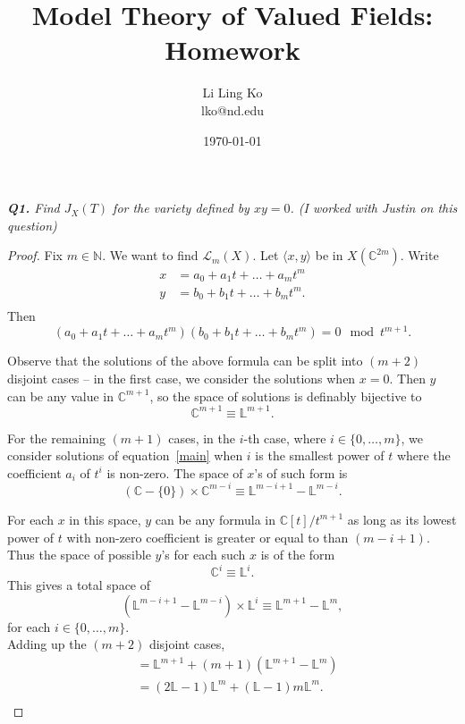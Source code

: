 \documentclass{article}
\begin{document}
\title{Model Theory of Valued Fields: Homework}
\author{Li Ling Ko\\ lko@nd.edu}
\date{\today}
\maketitle

\it \textbf{Q1.} Find $J_X(T)$ for the variety defined by $xy=0$. (I
worked with Justin on this question)
\begin{proof}
  Fix $m\in\mathbb{N}$. We want to find $\mathcal{L}_m(X)$. Let $\langle x,
  y\rangle$ be in $X(\mathbb{C}^{2m})$. Write
  \begin{align*}
    x &=a_0+a_1t+\ldots+a_mt^m\\
    y &=b_0+b_1t+\ldots+b_mt^m.\\
  \end{align*}
  Then
  \begin{equation}
    \label{main}
    (a_0+a_1t+\ldots+a_mt^m) (b_0+b_1t+\ldots+b_mt^m)=0 \mod t^{m+1}.
  \end{equation}

  Observe that the solutions of the above formula can be split into $(m+2)$
  disjoint cases -- in the first case, we consider the solutions when
  $x=0$. Then $y$ can be any value in $\mathbb{C}^{m+1}$, so the space of
  solutions is definably bijective to 
  \[\mathbb{C}^{m+1} \equiv \mathbb{L}^{m+1}.\]

  For the remaining $(m+1)$ cases, in the $i$-th case, where
  $i\in\{0,\ldots,m\}$, we consider solutions of equation~\eqref{main} when
  $i$ is the smallest power of $t$ where the coefficient $a_i$ of $t^i$ is
  non-zero. The space of $x$'s of such form is
  \[(\mathbb{C}-\{0\}) \times\mathbb{C}^{m-i} \equiv
  \mathbb{L}^{m-i+1}-\mathbb{L}^{m-i}.\]

  For each $x$ in this space, $y$ can be any formula in
  $\mathbb{C}[t]/t^{m+1}$ as long as its lowest power of $t$ with non-zero
  coefficient is greater or equal to than $(m-i+1)$. Thus the space of
  possible $y$'s for each such $x$ is of the form
  \[\mathbb{C}^{i} \equiv \mathbb{L}^{i}.\]
  This gives a total space of
  \[(\mathbb{L}^{m-i+1}-\mathbb{L}^{m-i}) \times\mathbb{L}^{i} \equiv
  \mathbb{L}^{m+1}-\mathbb{L}^{m},\]
  for each $i\in\{0,\ldots,m\}$. \\

  Adding up the $(m+2)$ disjoint cases,
  \begin{align*}
    [\mathcal{L}_m(X)] &=\mathbb{L}^{m+1}
      +(m+1)(\mathbb{L}^{m+1}-\mathbb{L}^{m})\\
      &=(2\mathbb{L}-1)\mathbb{L}^m +(\mathbb{L}-1)m\mathbb{L}^m.\\
  \end{align*}


\end{proof}
\end{document}
